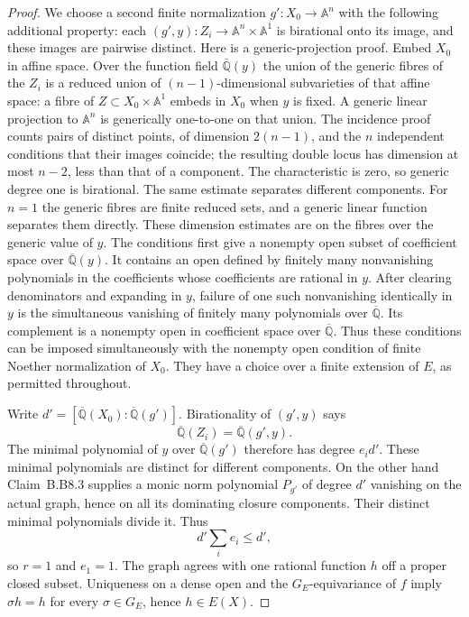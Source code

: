 \begin{proof}
We choose a second finite normalization
$g':X_0\to\mathbb A^n$ with the following additional property:
each $(g',y):Z_i\to\mathbb A^n\times\mathbb A^1$ is birational
onto its image, and these images are pairwise distinct.  Here is a
generic-projection proof.  Embed $X_0$ in affine space.  Over the
function field $\overline{\mathbb Q}(y)$ the union of the generic
fibres of the $Z_i$ is a reduced union of $(n-1)$-dimensional
subvarieties of that affine space: a fibre of
$Z\subset X_0\times\mathbb A^1$ embeds in $X_0$ when $y$ is
fixed.  A generic linear projection to $\mathbb A^n$ is
generically one-to-one on that union.  The incidence proof counts
pairs of distinct points, of dimension $2(n-1)$, and the $n$
independent conditions that their images coincide; the resulting
double locus has dimension at most $n-2$, less than that of a
component.  The characteristic is zero, so generic degree one is
birational.  The same estimate separates different components.
For $n=1$ the generic fibres are finite reduced sets, and a generic
linear function separates them directly.  These dimension estimates
are on the fibres over the generic value of $y$.  The conditions
first give a nonempty open subset of coefficient space over
$\overline{\mathbb Q}(y)$.  It contains an open defined by
finitely many nonvanishing polynomials in the coefficients whose
coefficients are rational in $y$.  After clearing denominators
and expanding in $y$, failure of one such nonvanishing identically
in $y$ is the simultaneous vanishing of finitely many polynomials
over $\overline{\mathbb Q}$.  Its complement is a nonempty open
in coefficient space over $\overline{\mathbb Q}$.  Thus these
conditions can be imposed simultaneously with the nonempty open
condition of finite Noether normalization of $X_0$.  They have a
choice over a finite extension of $E$, as permitted throughout.

Write $d'=[\overline{\mathbb Q}(X_0):
\overline{\mathbb Q}(g')]$.  Birationality of $(g',y)$ says
\[
 \overline{\mathbb Q}(Z_i)=
 \overline{\mathbb Q}(g',y).
\]
The minimal polynomial of $y$ over
$\overline{\mathbb Q}(g')$ therefore has degree $e_i d'$.
These minimal polynomials are distinct for different components.
On the other hand Claim~B.B8.3 supplies a monic norm polynomial
$P_{g'}$ of degree $d'$ vanishing on the actual graph, hence on
all its dominating closure components.  Their distinct minimal
polynomials divide it.  Thus
\[
                    d'\sum_i e_i\leq d',
\]
so $r=1$ and $e_1=1$.  The graph agrees with one rational function
$h$ off a proper closed subset.  Uniqueness on a dense open and
the $G_E$-equivariance of $f$ imply $\sigma h=h$ for every
$\sigma\in G_E$, hence $h\in E(X)$.


\end{proof}
